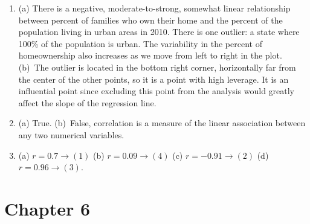 \documentclass[
  10pt,
  openany]{book}
\begin{document}
\begin{enumerate}
  \addtocounter{enumi}{1}
\item
  (a) There is a negative, moderate-to-strong, somewhat linear relationship between percent of families who own their home and the percent of the population living in urban areas in 2010. There is one outlier: a state where 100\% of the population is urban. The variability in the percent of homeownership also increases as we move from left to right in the plot. (b)~The outlier is located in the bottom right corner, horizontally far from the center of the other points, so it is a point with high leverage. It is an influential point since excluding this point from the analysis would greatly affect the slope of the regression line.

  \addtocounter{enumi}{1}
\item
  (a) True. (b)~False, correlation is a measure of the linear association between any two numerical variables.

  \addtocounter{enumi}{1}
\item
  (a) \(r = 0.7 \to (1)\) (b) \(r = 0.09 \to (4)\) (c) \(r = -0.91 \to (2)\) (d) \(r = 0.96 \to (3)\).

  \addtocounter{enumi}{1}
\end{enumerate}

\hypertarget{exercise-solutions-11}{%
\section{Chapter 6}\label{exercise-solutions-11}}
\end{document}
